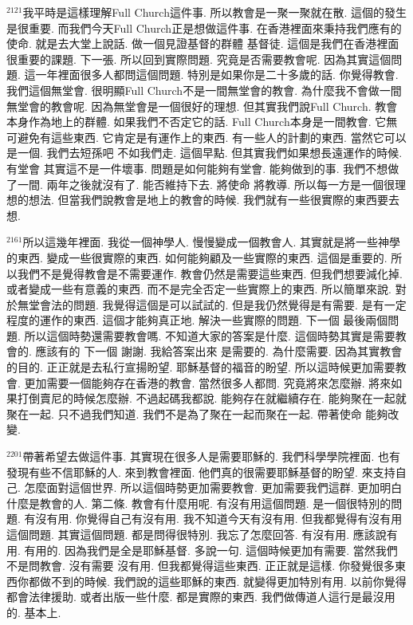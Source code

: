 \documentclass{book}
\begin{document}
$^{2121}$我平時是這樣理解Full Church這件事.
所以教會是一聚一聚就在散.
這個的發生是很重要.
而我們今天Full Church正是想做這件事.
在香港裡面來秉持我們應有的使命.
就是去大堂上說話.
做一個見證基督的群體 基督徒.
這個是我們在香港裡面很重要的課題.
下一張.
所以回到實際問題.
究竟是否需要教會呢.
因為其實這個問題.
這一年裡面很多人都問這個問題.
特別是如果你是二十多歲的話.
你覺得教會.
我們這個無堂會.
很明顯Full Church不是一間無堂會的教會.
為什麼我不會做一間無堂會的教會呢.
因為無堂會是一個很好的理想.
但其實我們說Full Church.
教會本身作為地上的群體.
如果我們不否定它的話.
Full Church本身是一間教會.
它無可避免有這些東西.
它肯定是有運作上的東西.
有一些人的計劃的東西.
當然它可以是一個.
我們去短孫吧 不如我們走.
這個早點.
但其實我們如果想長遠運作的時候.
有堂會 其實這不是一件壞事.
問題是如何能夠有堂會.
能夠做到的事.
我們不想做了一間.
兩年之後就沒有了.
能否維持下去.
將使命 將教導.
所以每一方是一個很理想的想法.
但當我們說教會是地上的教會的時候.
我們就有一些很實際的東西要去想.

$^{2161}$所以這幾年裡面.
我從一個神學人.
慢慢變成一個教會人.
其實就是將一些神學的東西.
變成一些很實際的東西.
如何能夠顧及一些實際的東西.
這個是重要的.
所以我們不是覺得教會是不需要運作.
教會仍然是需要這些東西.
但我們想要減化掉.
或者變成一些有意義的東西.
而不是完全否定一些實際上的東西.
所以簡單來說.
對於無堂會法的問題.
我覺得這個是可以試試的.
但是我仍然覺得是有需要.
是有一定程度的運作的東西.
這個才能夠真正地.
解決一些實際的問題.
下一個 最後兩個問題.
所以這個時勢還需要教會嗎.
不知道大家的答案是什麼.
這個時勢其實是需要教會的.
應該有的 下一個 謝謝.
我給答案出來 是需要的.
為什麼需要.
因為其實教會的目的.
正正就是去私行宣揚盼望.
耶穌基督的福音的盼望.
所以這時候更加需要教會.
更加需要一個能夠存在香港的教會.
當然很多人都問.
究竟將來怎麼辦.
將來如果打倒賣尼的時候怎麼辦.
不過起碼我都說.
能夠存在就繼續存在.
能夠聚在一起就聚在一起.
只不過我們知道.
我們不是為了聚在一起而聚在一起.
帶著使命 能夠改變.

$^{2201}$帶著希望去做這件事.
其實現在很多人是需要耶穌的.
我們科學學院裡面.
也有發現有些不信耶穌的人.
來到教會裡面.
他們真的很需要耶穌基督的盼望.
來支持自己.
怎麼面對這個世界.
所以這個時勢更加需要教會.
更加需要我們這群.
更加明白什麼是教會的人.
第二條.
教會有什麼用呢.
有沒有用這個問題.
是一個很特別的問題.
有沒有用.
你覺得自己有沒有用.
我不知道今天有沒有用.
但我都覺得有沒有用這個問題.
其實這個問題.
都是問得很特別.
我忘了怎麼回答.
有沒有用.
應該說有用.
有用的.
因為我們是全是耶穌基督.
多說一句.
這個時候更加有需要.
當然我們不是問教會.
沒有需要 沒有用.
但我都覺得這些東西.
正正就是這樣.
你發覺很多東西你都做不到的時候.
我們說的這些耶穌的東西.
就變得更加特別有用.
以前你覺得都會法律援助.
或者出版一些什麼.
都是實際的東西.
我們做傳道人這行是最沒用的.
基本上.
\end{document}
